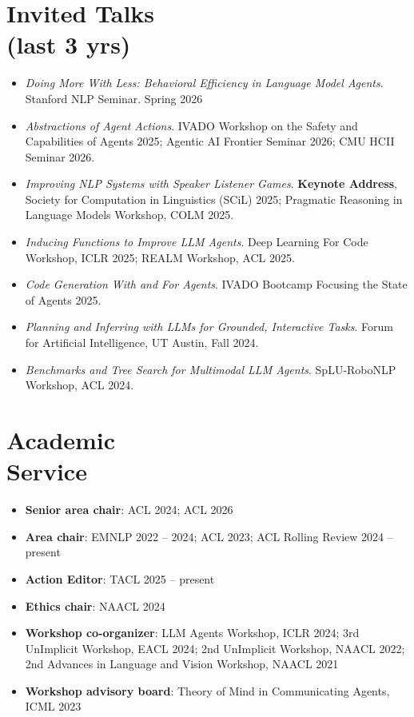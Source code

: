 \section{Invited Talks \\ (last 3 yrs)}
\begin{itemize}[leftmargin=-0.4mm,partopsep=0pt,label=]
  \item \emph{Doing More With Less: Behavioral Efficiency in Language Model Agents}. Stanford NLP Seminar. Spring 2026
  \item \emph{Abstractions of Agent Actions}. IVADO Workshop on the Safety and Capabilities of Agents 2025; Agentic AI Frontier Seminar 2026; CMU HCII Seminar 2026.
  \item \emph{Improving NLP Systems with Speaker Listener Games}. \textbf{Keynote Address}, Society for Computation in Linguistics (SCiL) 2025; Pragmatic Reasoning in Language Models Workshop, COLM 2025.
  \item \emph{Inducing Functions to Improve LLM Agents}. Deep Learning For Code Workshop, ICLR 2025; REALM Workshop, ACL 2025.
  \item \emph{Code Generation With and For Agents}. IVADO Bootcamp Focusing the State of Agents 2025.
  \item \emph{Planning and Inferring with LLMs for Grounded, Interactive Tasks}. Forum for Artificial Intelligence, UT Austin, Fall 2024.
  \item \emph{Benchmarks and Tree Search for Multimodal LLM Agents}. SpLU-RoboNLP Workshop, ACL 2024.
\end{itemize}
\vspace{-0.5em}

\section{Academic \\ Service}
\begin{itemize}[leftmargin=-0.4mm,partopsep=0pt,label=]
  \item \textbf{Senior area chair}: ACL 2024; ACL 2026
  \item \textbf{Area chair}: EMNLP 2022 -- 2024; ACL 2023; ACL Rolling Review 2024 -- present
  \item \textbf{Action Editor}: TACL 2025 -- present
  \item \textbf{Ethics chair}: NAACL 2024
  \item \textbf{Workshop co-organizer}: LLM Agents Workshop, ICLR 2024; 3rd UnImplicit Workshop, EACL 2024; 2nd UnImplicit Workshop, NAACL 2022; 2nd Advances in Language and Vision Workshop, NAACL 2021
  \item \textbf{Workshop advisory board}: Theory of Mind in Communicating Agents, ICML 2023
\end{itemize}

